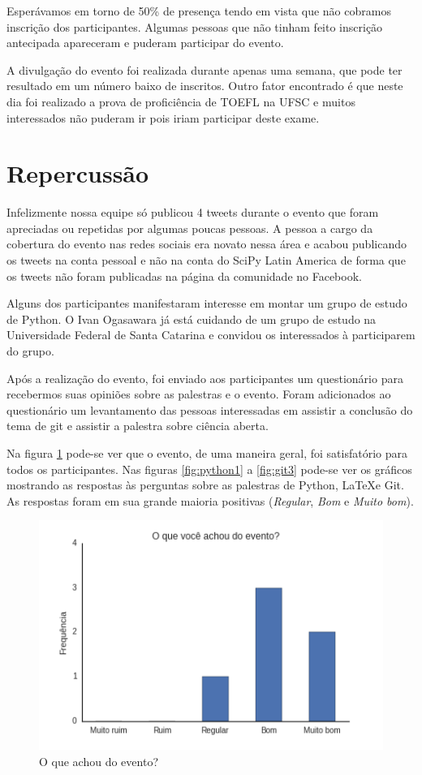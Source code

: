 \documentclass[12pt]{article}
\begin{document}
Esperávamos em torno de 50\% de presença tendo em vista que não cobramos
inscrição dos participantes.
Algumas pessoas que não tinham feito inscrição antecipada apareceram e puderam
participar do evento.

A divulgação do evento foi realizada durante apenas uma semana, que pode ter resultado em um número
baixo de inscritos. Outro fator encontrado é que neste dia foi realizado a prova de proficiência de
TOEFL na UFSC e muitos interessados não puderam ir pois iriam participar deste exame.
\newpage

\section*{Repercussão}

Infelizmente nossa equipe só publicou 4 tweets durante o evento que foram
apreciadas ou repetidas por algumas poucas pessoas.
A pessoa a cargo da cobertura do evento nas redes sociais era novato nessa área
e acabou publicando os tweets na conta pessoal e não na conta do SciPy Latin
America de forma que os tweets não foram publicadas na página da comunidade no
Facebook.

Alguns dos participantes manifestaram interesse em montar um grupo de estudo de Python. O Ivan
Ogasawara já está cuidando de um grupo de estudo na Universidade Federal de Santa Catarina e
convidou os interessados à participarem do grupo.

Após a realização do evento, foi enviado aos participantes um questionário para recebermos suas
opiniões sobre as palestras e o evento. Foram adicionados ao questionário um levantamento das
pessoas interessadas em assistir a conclusão do tema de git e assistir a palestra sobre ciência
aberta.

Na figura \ref{fig:evento} pode-se ver que o evento, de uma maneira geral, foi satisfatório para
todos os participantes. Nas figuras \ref{fig:python1} a \ref{fig:git3} pode-se ver os gráficos
mostrando as respostas às perguntas sobre as palestras de Python, \LaTeX e Git. As respostas
foram em sua grande maioria positivas (\textit{Regular}, \textit{Bom} e \textit{Muito bom}).

\begin{figure}[p]
    \centering
    \includegraphics[scale=0.6]{images/evento1.png}
    \caption{\label{fig:evento}O que achou do evento?}
\end{figure}
\end{document}
